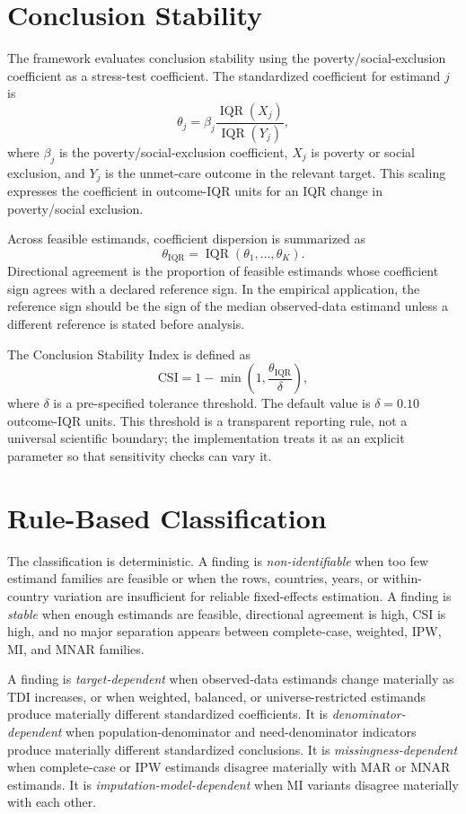 \section{Conclusion Stability}

The framework evaluates conclusion stability using the poverty/social-exclusion coefficient as a stress-test coefficient. The standardized coefficient for estimand \(j\) is
\[
\theta_j =
\beta_j \frac{\operatorname{IQR}(X_j)}{\operatorname{IQR}(Y_j)},
\]
where \(\beta_j\) is the poverty/social-exclusion coefficient, \(X_j\) is poverty or social exclusion, and \(Y_j\) is the unmet-care outcome in the relevant target. This scaling expresses the coefficient in outcome-IQR units for an IQR change in poverty/social exclusion.

Across feasible estimands, coefficient dispersion is summarized as
\[
\theta_{\mathrm{IQR}} =
\operatorname{IQR}(\theta_1,\ldots,\theta_K).
\]
Directional agreement is the proportion of feasible estimands whose coefficient sign agrees with a declared reference sign. In the empirical application, the reference sign should be the sign of the median observed-data estimand unless a different reference is stated before analysis.

The Conclusion Stability Index is defined as
\[
\mathrm{CSI} =
1 - \min\left(1,\frac{\theta_{\mathrm{IQR}}}{\delta}\right),
\]
where \(\delta\) is a pre-specified tolerance threshold. The default value is \(\delta=0.10\) outcome-IQR units. This threshold is a transparent reporting rule, not a universal scientific boundary; the implementation treats it as an explicit parameter so that sensitivity checks can vary it.

\section{Rule-Based Classification}

The classification is deterministic. A finding is \emph{non-identifiable} when too few estimand families are feasible or when the rows, countries, years, or within-country variation are insufficient for reliable fixed-effects estimation. A finding is \emph{stable} when enough estimands are feasible, directional agreement is high, CSI is high, and no major separation appears between complete-case, weighted, IPW, MI, and MNAR families.

A finding is \emph{target-dependent} when observed-data estimands change materially as TDI increases, or when weighted, balanced, or universe-restricted estimands produce materially different standardized coefficients. It is \emph{denominator-dependent} when population-denominator and need-denominator indicators produce materially different standardized conclusions. It is \emph{missingness-dependent} when complete-case or IPW estimands disagree materially with MAR or MNAR estimands. It is \emph{imputation-model-dependent} when MI variants disagree materially with each other.

